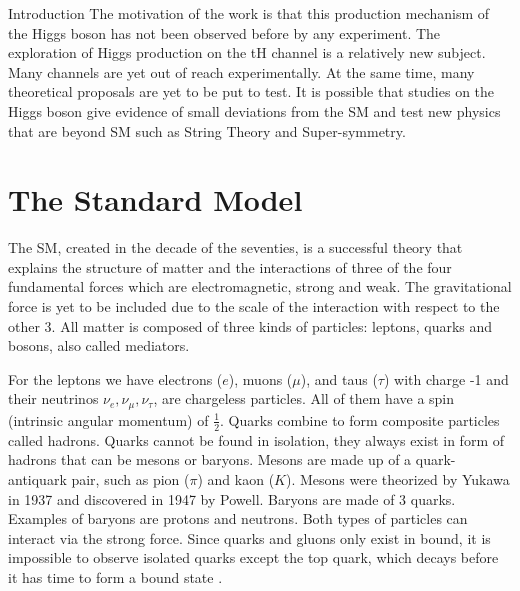 \begin{chapter}{Introduction}
The motivation of the work is that this production mechanism of the Higgs boson has not been observed before by any experiment. The exploration of Higgs production on the tH channel is a relatively new subject. %
Many channels are yet out of
reach experimentally. At the same time, many theoretical
proposals are yet to be put to test. It is possible that studies on the Higgs boson give evidence of small deviations from the SM and test new physics that are beyond SM such as String Theory and Super-symmetry. 

\section{The Standard Model} %
The SM, created in the decade of the seventies, is a successful theory that explains the structure of matter and the interactions of three of the four fundamental forces which are electromagnetic, strong and weak. The gravitational force is yet to be included due to the scale of the interaction with respect to the other 3. All matter is composed of three kinds of particles: leptons, quarks and bosons, also called mediators.

For the leptons we have electrons ($e$), muons ($\mu$), and taus ($\tau$) with charge -1 and their neutrinos $\nu_e, \nu_\mu, \nu_\tau$, are chargeless particles. %
 All of them have a spin (intrinsic angular momentum) of $\frac{1}{2}$\cite{griff}. %
 Quarks combine to form composite particles called hadrons. Quarks cannot be found in isolation, they always exist in form of hadrons that can be mesons or baryons. Mesons are made up of a quark-antiquark pair, such as pion ($\pi$) and kaon ($K$). Mesons were theorized by Yukawa in 1937 and discovered in 1947 by Powell\cite{griff}.
Baryons are made of 3 quarks. Examples of baryons are protons and neutrons. Both types of particles can interact via the strong force. Since quarks and gluons only exist in bound, it is impossible to observe isolated quarks except the top quark, which decays before it has time to form a
bound state \cite{gross}.


\end{chapter}
